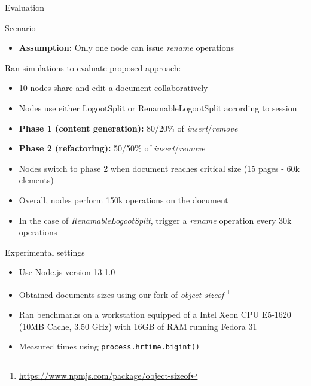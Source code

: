 \documentclass[10pt]{beamer}
\begin{document}
\begin{frame}[standout]
  Evaluation
\end{frame}


\begin{frame}{Scenario}
  \begin{itemize}
    \item \textbf{Assumption:} Only one node can issue \emph{rename} operations
  \end{itemize}

  \begin{block}{Ran simulations to evaluate proposed approach:}
    \begin{itemize}
      \item 10 nodes share and edit a document collaboratively
      \item Nodes use either LogootSplit or RenamableLogootSplit according to session
      \pause
      \item \textbf{Phase 1 (content generation):} 80/20\% of \emph{insert}/\emph{remove}
      \item \textbf{Phase 2 (refactoring):} 50/50\% of \emph{insert}/\emph{remove}
      \item Nodes switch to phase 2 when document reaches critical size (15 pages - 60k elements)
      \pause
      \item Overall, nodes perform 150k operations on the document
      \item In the case of \emph{RenamableLogootSplit}, trigger a \emph{rename} operation every 30k operations
    \end{itemize}
  \end{block}
\end{frame}

\begin{frame}{Experimental settings}
  \begin{itemize}
    \item Use Node.js version 13.1.0
    \item Obtained documents sizes using our fork of \emph{object-sizeof} \footnote{\url{https://www.npmjs.com/package/object-sizeof}}
    \item Ran benchmarks on a workstation equipped of a Intel Xeon CPU E5-1620 (10MB Cache, 3.50 GHz) with 16GB of RAM running Fedora 31
    \item Measured times using \texttt{process.hrtime.bigint()}
  \end{itemize}
\end{frame}
\end{document}
